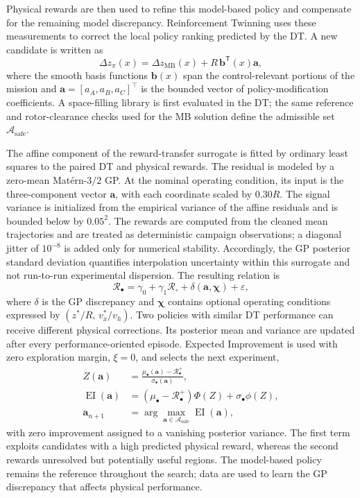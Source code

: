 \documentclass[journal]{IEEEtran}
\begin{document}
Physical rewards are then used to refine this model-based policy and compensate for the remaining model discrepancy. Reinforcement Twinning uses these measurements to correct the local policy ranking predicted by the DT. A new candidate is written as
\begin{equation}
 \Delta z_{\pi}(x)=\Delta z_{\mathrm{MB}}(x)+
 R\,\mathbf{b}^{\mathsf T}(x)\mathbf a,
 \label{eq:rt-policy}
\end{equation}
where the smooth basis functions $\mathbf{b}(x)$ span the control-relevant portions of the mission and $\mathbf a=[a_A,a_B,a_C]^\top$ is the bounded vector of policy-modification coefficients. A space-filling library is first evaluated in the DT; the same reference and rotor-clearance checks used for the MB solution define the admissible set $\mathcal A_{\mathrm{safe}}$.

The affine component of the reward-transfer surrogate is fitted by ordinary least squares to the paired DT and physical rewards. The residual is modeled by a zero-mean Mat\'ern-$3/2$ GP. At the nominal operating condition, its input is the three-component vector $\mathbf a$, with each coordinate scaled by $0.30R$. The signal variance is initialized from the empirical variance of the affine residuals and is bounded below by $0.05^2$. The rewards are computed from the cleaned mean trajectories and are treated as deterministic campaign observations; a diagonal jitter of $10^{-8}$ is added only for numerical stability. Accordingly, the GP posterior standard deviation quantifies interpolation uncertainty within this surrogate and not run-to-run experimental dispersion. The resulting relation is
\begin{equation}
 \mathcal{R}_{\bullet}=
 \gamma_0+\gamma_1\mathcal{R}_{\circ}
 +\delta(\mathbf a,\boldsymbol{\chi})+\varepsilon,
 \label{eq:reward-transfer}
\end{equation}
where $\delta$ is the GP discrepancy and $\boldsymbol{\chi}$ contains optional operating conditions expressed by $(z^\ast/R,\,v_x^\ast/v_h)$. Two policies with similar DT performance can receive different physical corrections. Its posterior mean and variance are updated after every performance-oriented episode. Expected Improvement is used with zero exploration margin, $\xi=0$, and selects the next experiment,
\begin{align}
 Z(\mathbf a)&=
 \frac{\mu_{\bullet}(\mathbf a)-\mathcal{R}_{\bullet}^{+}}
 {\sigma_{\bullet}(\mathbf a)},\\
 \operatorname{EI}(\mathbf a)&=
 \left(\mu_{\bullet}-\mathcal{R}_{\bullet}^{+}\right)\Phi(Z)
 +\sigma_{\bullet}\phi(Z),\\
 \mathbf a_{n+1}&=
 \arg\max_{\mathbf a\in\mathcal A_{\mathrm{safe}}}
 \operatorname{EI}(\mathbf a),
 \label{eq:ei}
\end{align}
with zero improvement assigned to a vanishing posterior variance. The first term exploits candidates with a high predicted physical reward, whereas the second rewards unresolved but potentially useful regions. The model-based policy remains the reference throughout the search; data are used to learn the GP discrepancy that affects physical performance.
\end{document}

